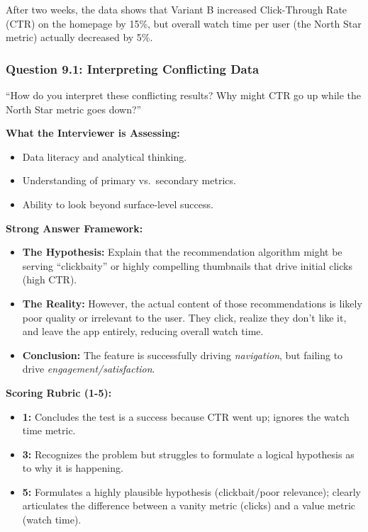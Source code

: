 \documentclass[
  11pt,
  openany,
  oneside]{book}
\providecommand{\tightlist}{%
  \setlength{\itemsep}{0pt}\setlength{\parskip}{0pt}}
\begin{document}
After two weeks, the data shows that Variant B increased Click-Through
Rate (CTR) on the homepage by 15\%, but overall watch time per user (the
North Star metric) actually decreased by 5\%.

\subsubsection{Question 9.1: Interpreting Conflicting
Data}\label{question-9.1-interpreting-conflicting-data}

``How do you interpret these conflicting results? Why might CTR go up
while the North Star metric goes down?''

\textbf{What the Interviewer is Assessing:}

\begin{itemize}
\tightlist
\item
  Data literacy and analytical thinking.
\item
  Understanding of primary vs.~secondary metrics.
\item
  Ability to look beyond surface-level success.
\end{itemize}

\textbf{Strong Answer Framework:}

\begin{itemize}
\tightlist
\item
  \textbf{The Hypothesis:} Explain that the recommendation algorithm
  might be serving ``clickbaity'' or highly compelling thumbnails that
  drive initial clicks (high CTR).
\item
  \textbf{The Reality:} However, the actual content of those
  recommendations is likely poor quality or irrelevant to the user. They
  click, realize they don't like it, and leave the app entirely,
  reducing overall watch time.
\item
  \textbf{Conclusion:} The feature is successfully driving
  \emph{navigation}, but failing to drive
  \emph{engagement/satisfaction}.
\end{itemize}

\textbf{Scoring Rubric (1-5):}

\begin{itemize}
\tightlist
\item
  \textbf{1:} Concludes the test is a success because CTR went up;
  ignores the watch time metric.
\item
  \textbf{3:} Recognizes the problem but struggles to formulate a
  logical hypothesis as to why it is happening.
\item
  \textbf{5:} Formulates a highly plausible hypothesis (clickbait/poor
  relevance); clearly articulates the difference between a vanity metric
  (clicks) and a value metric (watch time).
\end{itemize}
\end{document}
